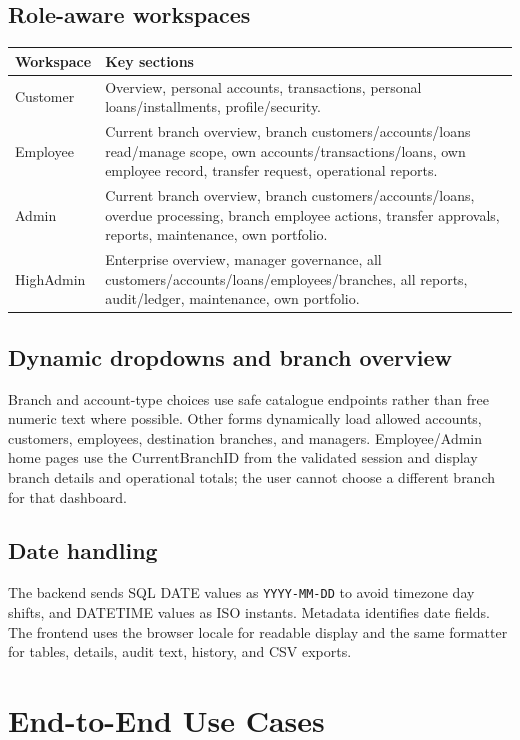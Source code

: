 \documentclass[11pt,a4paper,oneside]{report}
\begin{document}
\section{Role-aware workspaces}
\begin{longtable}{L{0.16\textwidth}L{0.76\textwidth}}
\toprule\textbf{Workspace} & \textbf{Key sections}\\\midrule
Customer & Overview, personal accounts, transactions, personal loans/installments, profile/security.\\
Employee & Current branch overview, branch customers/accounts/loans read/manage scope, own accounts/transactions/loans, own employee record, transfer request, operational reports.\\
Admin & Current branch overview, branch customers/accounts/loans, overdue processing, branch employee actions, transfer approvals, reports, maintenance, own portfolio.\\
HighAdmin & Enterprise overview, manager governance, all customers/accounts/loans/employees/branches, all reports, audit/ledger, maintenance, own portfolio.\\
\bottomrule
\end{longtable}

\section{Dynamic dropdowns and branch overview}
Branch and account-type choices use safe catalogue endpoints rather than free numeric text where possible. Other forms dynamically load allowed accounts, customers, employees, destination branches, and managers. Employee/Admin home pages use the CurrentBranchID from the validated session and display branch details and operational totals; the user cannot choose a different branch for that dashboard.

\section{Date handling}
The backend sends SQL DATE values as \texttt{YYYY-MM-DD} to avoid timezone day shifts, and DATETIME values as ISO instants. Metadata identifies date fields. The frontend uses the browser locale for readable display and the same formatter for tables, details, audit text, history, and CSV exports.

\chapter{End-to-End Use Cases}
\end{document}

